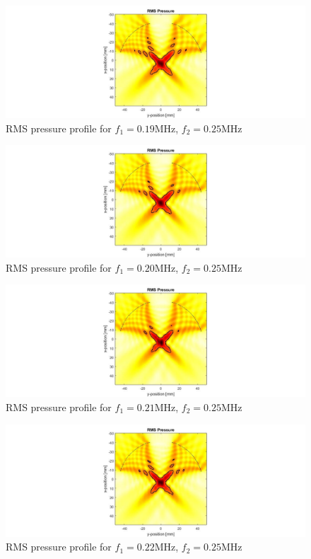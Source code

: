 \documentclass[10pt,a4paper]{article}
\begin{document}
\begin{figure}[!h]\label{f190kHz}
\hspace*{-5cm}                                                    
\includegraphics[scale=0.6]{f190kHz}
\caption{RMS pressure profile for $f_1 = 0.19$MHz, $f_2 = 0.25$MHz}
\end{figure}
\begin{figure}[!h]\label{f200kHz}
\hspace*{-5cm}                                                    
\includegraphics[scale=0.6]{f200kHz}
\caption{RMS pressure profile for $f_1 = 0.20$MHz, $f_2 = 0.25$MHz}
\end{figure}
\begin{figure}[!h]\label{f210kHz}
\hspace*{-5cm}                                                    
\includegraphics[scale=0.6]{f210kHz}
\caption{RMS pressure profile for $f_1 = 0.21$MHz, $f_2 = 0.25$MHz}
\end{figure}
\begin{figure}[!h]\label{f220kHz}
\hspace*{-5cm}                                                    
\includegraphics[scale=0.6]{f220kHz}
\caption{RMS pressure profile for $f_1 = 0.22$MHz, $f_2 = 0.25$MHz}
\end{figure}
\end{document}
